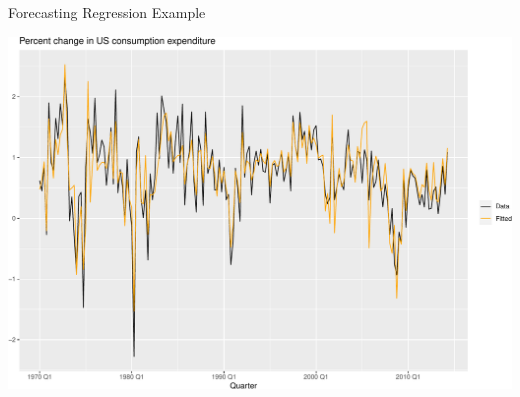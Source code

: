 \documentclass[
  ignorenonframetext,
]{beamer}
\begin{document}
\begin{frame}{Forecasting \textbar{} \small Regression Example}
\protect\hypertarget{forecasting-regression-example-6}{}
\tiny

\includegraphics{Time-series-regression-models_files/figure-beamer/unnamed-chunk-20-1.pdf}

\normalfont
\end{frame}
\end{document}

